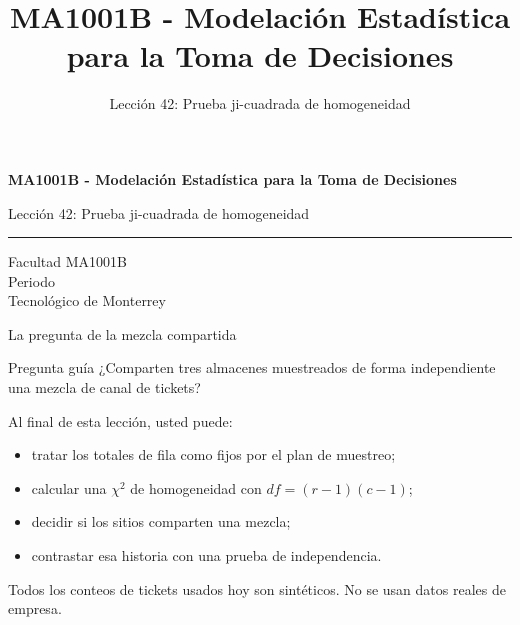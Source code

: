 \documentclass[aspectratio=169,10pt,spanish]{beamer}
\title{MA1001B - Modelación Estadística para la Toma de Decisiones}
\subtitle{Lección 42: Prueba ji-cuadrada de homogeneidad}
\author{}
\institute{Tecnol\'ogico de Monterrey}
\date{}
\begin{document}
\begin{frame}[plain]
  \vspace{1.2cm}
  {\Large\bfseries MA1001B - Modelación Estadística para la Toma de Decisiones\par}
  \vspace{0.7cm}
  {\large Lección 42: Prueba ji-cuadrada de homogeneidad\par}
  \vspace{0.7cm}
  {\color{TecRojo}\rule{\textwidth}{1.2pt}}
  \vspace{0.8cm}

  Facultad MA1001B\\[0.3cm]
  Periodo\\[0.3cm]
  Tecnol\'ogico de Monterrey
\end{frame}

\begin{frame}{La pregunta de la mezcla compartida}
  \begin{alertblock}{Pregunta guía}
    ¿Comparten tres almacenes muestreados de forma independiente una mezcla
    de canal de tickets?
  \end{alertblock}

  \vspace{0.6em}
  Al final de esta lección, usted puede:
  \begin{itemize}
    \item tratar los totales de fila como fijos por el plan de muestreo;
    \item calcular una $\chi^2$ de homogeneidad con $df=(r-1)(c-1)$;
    \item decidir si los sitios comparten una mezcla;
    \item contrastar esa historia con una prueba de independencia.
  \end{itemize}

  \vfill
  \scriptsize Todos los conteos de tickets usados hoy son sintéticos. No se usan datos reales de empresa.
\end{frame}
\end{document}
